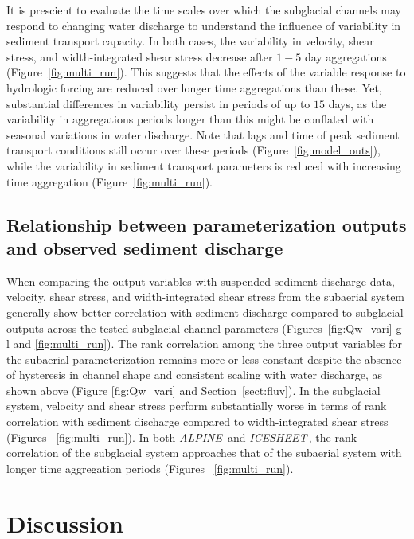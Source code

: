 \documentclass[11pt]{article}
\newcommand{\alpine}{\textit{ALPINE}\,}
\newcommand{\icesheet}{\textit{ICESHEET}\,}
\begin{document}
It is prescient to evaluate the time scales over which the subglacial channels may respond to changing water discharge to understand the influence of variability in sediment transport capacity.
In both cases, the variability in velocity, shear stress, and width-integrated shear stress decrease after $1-5$ day aggregations (Figure~\ref{fig:multi_run}).
This suggests that the effects of the variable response to hydrologic forcing are reduced over longer time aggregations than these.
Yet, substantial differences in variability persist in periods of up to $15$ days, as the variability in aggregations periods longer than this might be conflated with seasonal variations in water discharge.
Note that lags and time of peak sediment transport conditions still occur over these periods (Figure~\ref{fig:model_outs}), while the variability in sediment transport parameters is reduced with increasing time aggregation (Figure~\ref{fig:multi_run}).

\subsection{Relationship between parameterization  outputs and observed sediment discharge}
When comparing the output variables with suspended sediment discharge data, velocity, shear stress, and width-integrated shear stress from the subaerial system generally show better correlation with sediment discharge compared to subglacial outputs across the tested subglacial channel parameters (Figures~\ref{fig:Qw_vari} g--l and \ref{fig:multi_run}).
The rank correlation among the three output variables for the subaerial parameterization remains more or less constant despite the absence of hysteresis in channel shape and consistent scaling with water discharge, as shown above (Figure \ref{fig:Qw_vari} and Section~\ref{sect:fluv}).
In the subglacial system, velocity and shear stress perform substantially worse in terms of rank correlation with sediment discharge compared to width-integrated shear stress (Figures~ \ref{fig:multi_run}).
In both \alpine{} and \icesheet{}, the rank correlation of the subglacial system approaches that of the subaerial system with longer time aggregation periods (Figures~ \ref{fig:multi_run}).


\section{Discussion}
\end{document}
